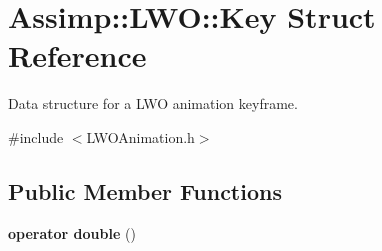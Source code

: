 \hypertarget{struct_assimp_1_1_l_w_o_1_1_key}{\section{Assimp\+:\+:L\+W\+O\+:\+:Key Struct Reference}
\label{struct_assimp_1_1_l_w_o_1_1_key}
}


Data structure for a L\+W\+O animation keyframe.  




{\ttfamily \#include $<$L\+W\+O\+Animation.\+h$>$}

\subsection*{Public Member Functions}
\begin{DoxyCompactItemize}
\item 
\hypertarget{struct_assimp_1_1_l_w_o_1_1_key_aa75ccec7412ee7752a505e026e5758e0}{{\bfseries operator double} ()}\label{struct_assimp_1_1_l_w_o_1_1_key_aa75ccec7412ee7752a505e026e5758e0}

\end{DoxyCompactItemize}
